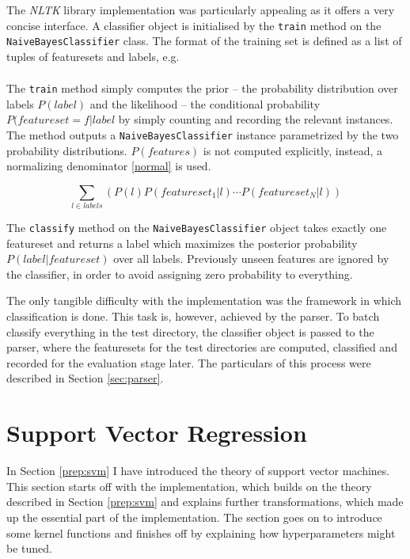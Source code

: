 \documentclass[12pt,notitlepage,twoside]{scrreprt}
\begin{document}
The \textit{NLTK} library implementation was particularly appealing as it offers a very
concise interface. A classifier object is initialised by the \texttt{train}
method on the \texttt{NaiveBayesClassifier} class. The format of the training
set is defined as a list of tuples of featuresets and labels, e.g.
\begin{gather*}
[(featureset_1, label_1), \cdots, (featureset_N,
label_N)]
\end{gather*}

The \texttt{train} method simply computes the prior -- the probability
distribution over labels \(P(label)\) and the likelihood -- the conditional
probability \(P(featureset=f|label\) by simply counting and recording the
relevant instances. The method outputs a \texttt{NaiveBayesClassifier} instance
parametrized by the two probability distributions. \(P(features)\) is not
computed explicitly, instead, a normalizing denominator \ref{normal} is used.

\begin{equation} \sum_{l \in labels}(P(l)P(featureset_1|l)\cdots
	P(featureset_N|l)) \label{normal} \end{equation}

The \texttt{classify} method on the \texttt{NaiveBayesClassifier} object takes
exactly one featureset and returns a label which maximizes the posterior
probability \(P(label|featureset)\) over all labels.  Previously unseen features
are ignored by the classifier, in order to avoid assigning zero probability to
everything.

The only tangible difficulty with the implementation was the
framework in which classification is done. This task is, however, achieved by
the parser. To batch classify everything in the test directory, the classifier
object is passed to the parser, where the featuresets for the test directories
are computed, classified and recorded for the evaluation stage later. The
particulars of this process were described in Section \ref{sec:parser}.

\section{Support Vector Regression}
\label{sec:svm}
In Section \ref{prep:svm} I have introduced the theory of support vector machines. This
section starts off with the implementation, which builds on the theory described in
Section \ref{prep:svm} and explains further transformations, which made up the essential
part of the implementation. The section goes on to introduce some kernel functions and
finishes off by explaining how hyperparameters might be tuned.
\end{document}
